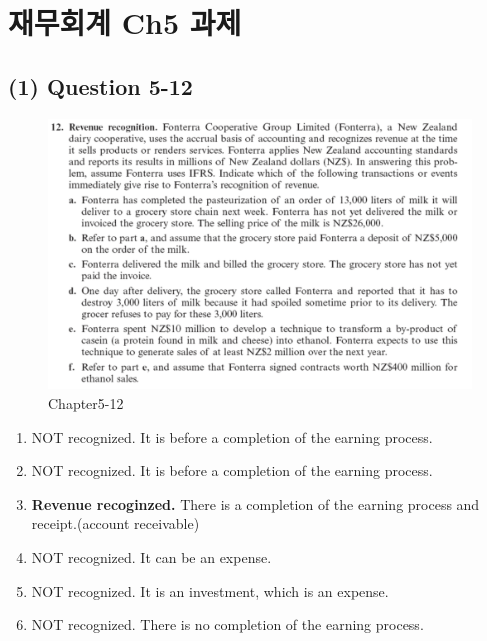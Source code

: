 \documentclass[
  a4paper,
  DIV=11,
  numbers=noendperiod]{scrreprt}
\providecommand{\tightlist}{%
  \setlength{\itemsep}{0pt}\setlength{\parskip}{0pt}}\usepackage{longtable,booktabs,array}
\begin{document}
\chapter*{재무회계 Ch5
과제}\label{uxc7acuxbb34uxd68cuxacc4-ch5-uxacfcuxc81c}


\section*{(1) Question 5-12}\label{question-5-12}


\begin{figure}[H]

{\centering \includegraphics{images/재무회계_5-12.png}

}

\caption{Chapter5-12}

\end{figure}%

\begin{enumerate}
\def\labelenumi{(\alph{enumi})}
\tightlist
\item
  NOT recognized. It is before a completion of the earning process.
\item
  NOT recognized. It is before a completion of the earning process.
\item
  \textbf{Revenue recoginzed.} There is a completion of the earning
  process and receipt.(account receivable)
\item
  NOT recognized. It can be an expense.
\item
  NOT recognized. It is an investment, which is an expense.
\item
  NOT recognized. There is no completion of the earning process.
\end{enumerate}
\end{document}
